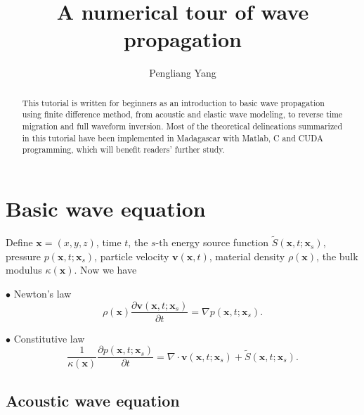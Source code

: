 \title{A numerical tour of wave propagation}
\renewcommand{\thefootnote}{\fnsymbol{footnote}}
\author{Pengliang Yang}

\address{Xi'an Jiaotong University, Xi'an, China, 710049}       


\maketitle
\begin{abstract}
 This tutorial is written for beginners as an introduction to basic wave propagation using finite difference method, from acoustic and elastic wave modeling, to reverse time migration and full waveform inversion. Most of the theoretical delineations summarized in this tutorial have been implemented in Madagascar with Matlab, C and CUDA programming, which will benefit readers' further study.
\end{abstract}

\section{Basic wave equation}

Define  $\textbf{x}=(x,y,z)$, time $t$, the $s$-th energy source function $ \tilde{S}(\textbf{x},t;\textbf{x}_s) $, pressure $p(\textbf{x},t; \textbf{x}_s)$, particle velocity $ \textbf{v}(\textbf{x},t) $, material density $ \rho(\textbf{x}) $, the bulk modulus $\kappa(\textbf{x})$. Now we have
\begin{description}
	\item $\bullet$ Newton's law
	\begin{equation}\label{eq:newton}
	\rho(\textbf{x})\frac{\partial\textbf{v}(\textbf{x},t;\textbf{x}_s)}{\partial t}=\nabla p(\textbf{x},t;\textbf{x}_s).
	\end{equation}

	\item $\bullet$ Constitutive law
	\begin{equation}\label{eq:constitutive}
	\frac{1}{\kappa(\textbf{x})}\frac{\partial p(\textbf{x},t;\textbf{x}_s)}{\partial t}=\nabla \cdot \textbf{v}(\textbf{x},t;\textbf{x}_s)+\tilde{S}(\textbf{x},t;\textbf{x}_s).
	\end{equation}
\end{description}

\subsection{Acoustic wave equation}

